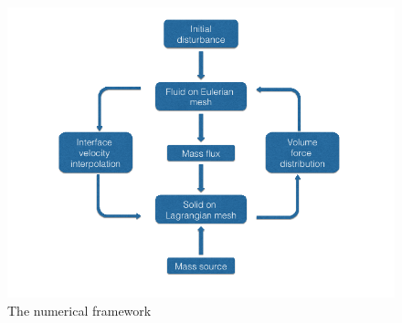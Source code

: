 \begin{figure}[H]
   \centering
   \includegraphics[width=.5\textwidth]{./figs/framework.png} %
   \caption{The numerical framework}
   \label{fig:framework}
\end{figure}





